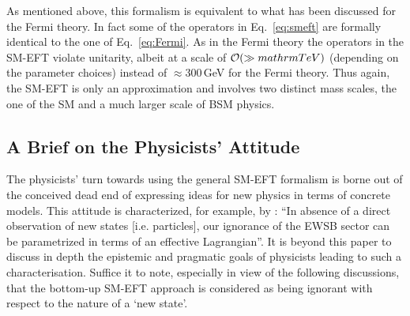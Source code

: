 As mentioned above, this formalism is equivalent to what has been discussed for the Fermi theory. 
In fact some of the operators in Eq.~\ref{eq:smeft} are formally identical to the one of Eq.~\ref{eq:Fermi}. 
As in the Fermi theory the operators in the SM-EFT violate
unitarity, albeit at a scale of ${\cal O}(\gg mathrm{TeV})$ (depending on the
parameter choices) instead of $\approx
300$\,GeV for the Fermi theory. Thus again, the SM-EFT is only an approximation and
involves two distinct mass scales, the one of the SM and a much larger scale of BSM physics.


\subsection{A Brief on the Physicists' Attitude}
\label{sec:physrepres}

The physicists' turn towards using the general SM-EFT formalism is borne out of the conceived dead end of expressing ideas for new physics in terms of concrete models.
This attitude is characterized, for example, by \cite[p.~1]{Contino:2013kra}:
``In absence of a direct observation of new states [i.e.{} particles], our ignorance of the EWSB sector can be parametrized 
in terms of an effective Lagrangian''.
It is beyond this paper to discuss in depth the epistemic and pragmatic goals of physicists leading to such a characterisation.
Suffice it to note, especially in view of the following discussions, that the bottom-up SM-EFT approach is considered as being ignorant with respect to the nature of a `new state'.

